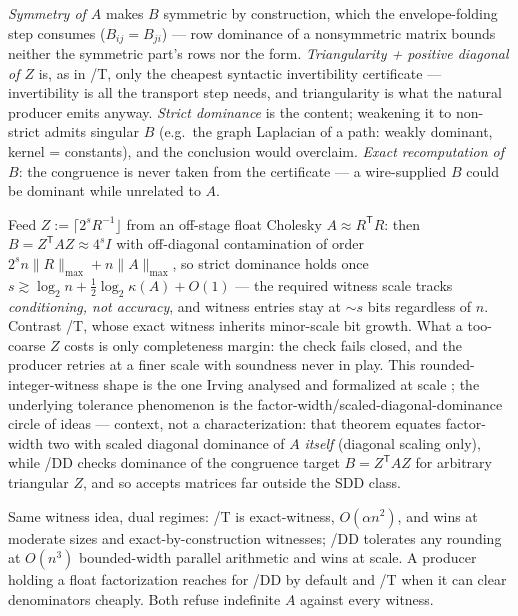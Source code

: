 \begin{bremark}
\emph{Symmetry of $A$} makes $B$ symmetric by construction, which the
envelope-folding step consumes ($B_{ij} = B_{ji}$) --- row dominance of
a nonsymmetric matrix bounds neither the symmetric part's rows nor the
form. \emph{Triangularity + positive diagonal of $Z$} is, as in /T,
only the cheapest syntactic invertibility certificate --- invertibility
is all the transport step needs, and triangularity is what the natural
producer emits anyway. \emph{Strict dominance} is the content;
weakening it to non-strict admits singular $B$ (e.g.\ the graph
Laplacian of a path: weakly dominant, kernel = constants), and the
conclusion would overclaim. \emph{Exact recomputation of $B$}: the
congruence is never taken from the certificate --- a wire-supplied $B$
could be dominant while unrelated to $A$.
\end{bremark}

\begin{bremark}
Feed $Z := \lceil 2^s R^{-1} \rfloor$ from an off-stage float Cholesky
$A \approx R^{\mathsf T} R$: then $B = Z^{\mathsf T} A Z \approx 4^s I$
with off-diagonal contamination of order $2^s n \|R\|_{\max} +
n\|A\|_{\max}$, so strict dominance holds once
$s \gtrsim \log_2 n + \tfrac12 \log_2 \kappa(A) + O(1)$ --- the
required witness scale tracks \emph{conditioning, not accuracy}, and
witness entries stay at $\sim s$ bits regardless of $n$. Contrast /T,
whose exact witness inherits minor-scale bit growth. What a too-coarse
$Z$ costs is only completeness margin: the check fails closed, and the
producer retries at a finer scale with soundness never in play. This
rounded-integer-witness shape is the one Irving analysed and formalized
at scale \cite{irving2026certificate,irvingaks}; the underlying
tolerance phenomenon is the factor-width/scaled-diagonal-dominance
circle of ideas \cite{boman2005} --- context, not a characterization:
that theorem equates factor-width two with scaled diagonal dominance
of $A$ \emph{itself} (diagonal scaling only), while /DD checks
dominance of the congruence target $B = Z^{\mathsf T} A Z$ for
arbitrary triangular $Z$, and so accepts matrices far outside the SDD
class.
\end{bremark}

\begin{bremark}
Same witness idea, dual regimes: /T is exact-witness,
$O(\alpha n^2)$, and wins at moderate sizes and exact-by-construction
witnesses; /DD tolerates any rounding at $O(n^3)$ bounded-width
parallel arithmetic and wins at scale. A producer holding a float
factorization reaches for /DD by default and /T when it can clear
denominators cheaply. Both refuse indefinite $A$ against every witness.
\end{bremark}

